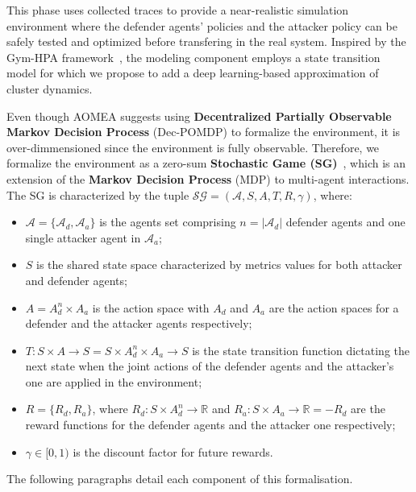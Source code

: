 \documentclass[conference]{IEEEtran}
\begin{document}
This phase uses collected traces to provide a near-realistic simulation environment where the defender agents' policies and the attacker policy can be safely tested and optimized before transfering in the real system. Inspired by the Gym-HPA framework~\cite{GymHPA}, the modeling component employs a state transition model for which we propose to add a deep learning-based approximation of cluster dynamics.

Even though AOMEA suggests using \textbf{Decentralized Partially Observable Markov Decision Process} (Dec-POMDP) to formalize the environment, it is over-dimmensioned since the environment is fully observable. Therefore, we formalize the environment as a zero-sum \textbf{Stochastic Game (SG)}~\cite{shapley1953stochastic}, which is an extension of the \textbf{Markov Decision Process} (MDP) to multi-agent interactions. The SG is characterized by the tuple $\mathcal{SG} = (\mathcal{A}, S, A, T, R, \gamma)$, where:

\begin{itemize}
  \item $\mathcal{A} = \{\mathcal{A}_d, \mathcal{A}_a\}$ is the agents set comprising $n = |\mathcal{A}_d|$ defender agents and one single attacker agent in $\mathcal{A}_a$;
  \item $S$ is the shared state space characterized by metrics values for both attacker and defender agents;
  \item $A = A_d^n \times A_a$ is the action space with $A_d$ and $A_a$ are the action spaces for a defender and the attacker agents respectively;
  \item $T: S \times A \rightarrow S = S \times A_d^n \times A_a \to S$ is the state transition function dictating the next state when the joint actions of the defender agents and the attacker's one are applied in the environment;
  \item $R = \{R_d, R_a\}$, where $R_d: S \times A_d^n \to \mathbb{R}$ and $R_a: S \times A_a \to \mathbb{R} = - R_d$ are the reward functions for the defender agents and the attacker one respectively;
  \item $\gamma \in [0, 1)$ is the discount factor for future rewards.
\end{itemize}

The following paragraphs detail each component of this formalisation.\\
\end{document}
